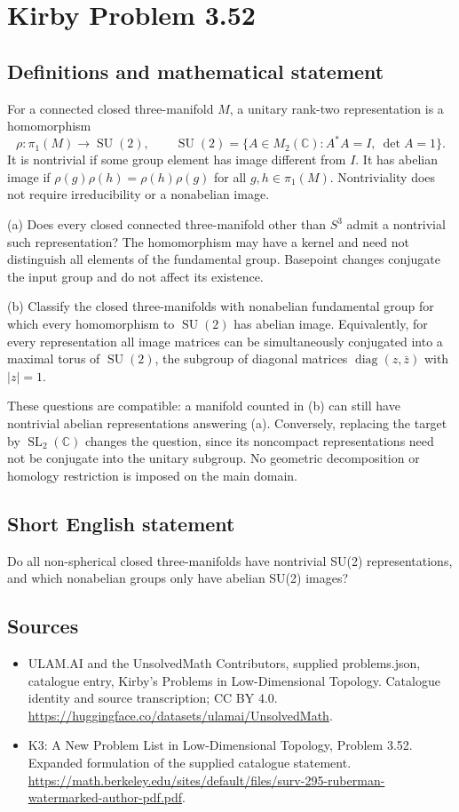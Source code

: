 \documentclass[11pt,a4paper]{article}
\begin{document}
\section*{Kirby Problem 3.52}\label{statement}

\subsection{Definitions and mathematical statement}
For a connected closed three-manifold $M$, a unitary rank-two representation is a homomorphism
\[
\rho:\pi_1(M)\longrightarrow\operatorname{SU}(2),\qquad
\operatorname{SU}(2)=\{A\in M_2(\mathbb C):A^*A=I,\ \det A=1\}.
\]
It is nontrivial if some group element has image different from $I$. It has abelian image if $\rho(g)\rho(h)=\rho(h)\rho(g)$ for all $g,h\in\pi_1(M)$. Nontriviality does not require irreducibility or a nonabelian image.

(a) Does every closed connected three-manifold other than $S^3$ admit a nontrivial such representation? The homomorphism may have a kernel and need not distinguish all elements of the fundamental group. Basepoint changes conjugate the input group and do not affect its existence.

(b) Classify the closed three-manifolds with nonabelian fundamental group for which every homomorphism to $\operatorname{SU}(2)$ has abelian image. Equivalently, for every representation all image matrices can be simultaneously conjugated into a maximal torus of $\operatorname{SU}(2)$, the subgroup of diagonal matrices $\operatorname{diag}(z,\bar z)$ with $|z|=1$.

These questions are compatible: a manifold counted in (b) can still have nontrivial abelian representations answering (a). Conversely, replacing the target by $\operatorname{SL}_2(\mathbb C)$ changes the question, since its noncompact representations need not be conjugate into the unitary subgroup. No geometric decomposition or homology restriction is imposed on the main domain.
\subsection{Short English statement}
Do all non-spherical closed three-manifolds have nontrivial SU(2) representations, and which nonabelian groups only have abelian SU(2) images?
\subsection{Sources}
\begin{itemize}
\item[S1] ULAM.AI and the UnsolvedMath Contributors, supplied problems.json, catalogue entry, Kirby's Problems in Low-Dimensional Topology. Catalogue identity and source transcription; CC BY 4.0.
\url{https://huggingface.co/datasets/ulamai/UnsolvedMath}.
\item[S2] K3: A New Problem List in Low-Dimensional Topology, Problem 3.52. Expanded formulation of the supplied catalogue statement.
\url{https://math.berkeley.edu/sites/default/files/surv-295-ruberman-watermarked-author-pdf.pdf}.
\end{itemize}
\end{document}
